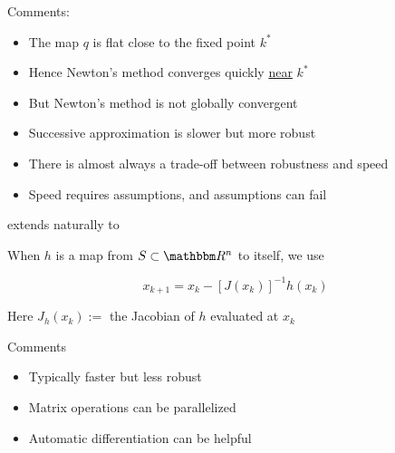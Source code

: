 \begin{frame}
    
    Comments:
    \begin{itemize}
        \item The map $q$ is flat close to the fixed point $k^*$
            \vspace{0.5em}
        \item Hence Newton's method converges quickly \underline{near} $k^*$
            \vspace{0.5em}
        \item But Newton's method is not globally convergent
            \vspace{0.5em}
        \item Successive approximation is slower but more robust
    \end{itemize}


    \begin{itemize}
        \item There is almost always a trade-off between robustness and speed
            \vspace{0.5em}
        \item Speed requires assumptions, and assumptions can fail
    \end{itemize}


\end{frame}


\begin{frame}
    
     extends naturally to 

            \vspace{0.5em}
    When $h$ is a map from $S \subset \RR^n$ to itself, we use

    \begin{equation*}
        x_{k+1} = x_k - [J(x_k)]^{-1} h(x_k)
    \end{equation*}

    Here $J_h(x_k) := $ the Jacobian of $h$ evaluated at $x_k$

    \vspace{1em}

    Comments
    \begin{itemize}
        \item Typically faster but less robust
            \vspace{0.5em}
        \item Matrix operations can be parallelized
            \vspace{0.5em}
        \item Automatic differentiation can be helpful
    \end{itemize}



\end{frame}




